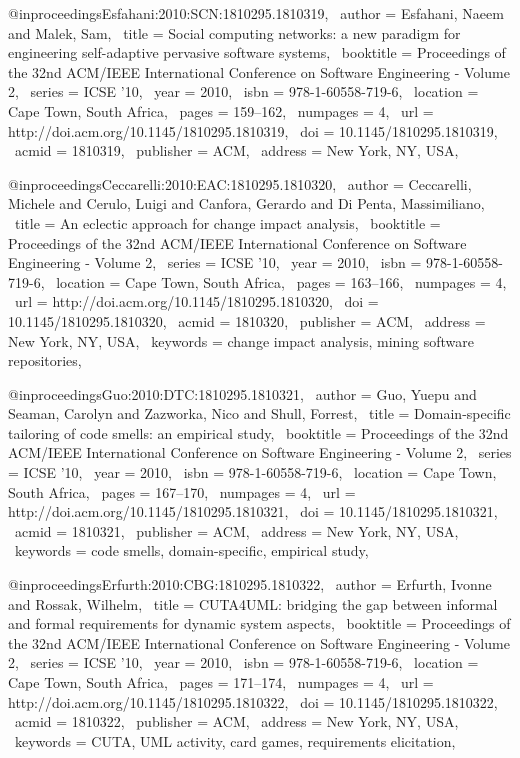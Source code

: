 @inproceedings{Esfahani:2010:SCN:1810295.1810319,
 author = {Esfahani, Naeem and Malek, Sam},
 title = {Social computing networks: a new paradigm for engineering self-adaptive pervasive software systems},
 booktitle = {Proceedings of the 32nd ACM/IEEE International Conference on Software Engineering - Volume 2},
 series = {ICSE '10},
 year = {2010},
 isbn = {978-1-60558-719-6},
 location = {Cape Town, South Africa},
 pages = {159--162},
 numpages = {4},
 url = {http://doi.acm.org/10.1145/1810295.1810319},
 doi = {10.1145/1810295.1810319},
 acmid = {1810319},
 publisher = {ACM},
 address = {New York, NY, USA},
} 

@inproceedings{Ceccarelli:2010:EAC:1810295.1810320,
 author = {Ceccarelli, Michele and Cerulo, Luigi and Canfora, Gerardo and Di Penta, Massimiliano},
 title = {An eclectic approach for change impact analysis},
 booktitle = {Proceedings of the 32nd ACM/IEEE International Conference on Software Engineering - Volume 2},
 series = {ICSE '10},
 year = {2010},
 isbn = {978-1-60558-719-6},
 location = {Cape Town, South Africa},
 pages = {163--166},
 numpages = {4},
 url = {http://doi.acm.org/10.1145/1810295.1810320},
 doi = {10.1145/1810295.1810320},
 acmid = {1810320},
 publisher = {ACM},
 address = {New York, NY, USA},
 keywords = {change impact analysis, mining software repositories},
} 

@inproceedings{Guo:2010:DTC:1810295.1810321,
 author = {Guo, Yuepu and Seaman, Carolyn and Zazworka, Nico and Shull, Forrest},
 title = {Domain-specific tailoring of code smells: an empirical study},
 booktitle = {Proceedings of the 32nd ACM/IEEE International Conference on Software Engineering - Volume 2},
 series = {ICSE '10},
 year = {2010},
 isbn = {978-1-60558-719-6},
 location = {Cape Town, South Africa},
 pages = {167--170},
 numpages = {4},
 url = {http://doi.acm.org/10.1145/1810295.1810321},
 doi = {10.1145/1810295.1810321},
 acmid = {1810321},
 publisher = {ACM},
 address = {New York, NY, USA},
 keywords = {code smells, domain-specific, empirical study},
} 

@inproceedings{Erfurth:2010:CBG:1810295.1810322,
 author = {Erfurth, Ivonne and Rossak, Wilhelm},
 title = {CUTA4UML: bridging the gap between informal and formal requirements for dynamic system aspects},
 booktitle = {Proceedings of the 32nd ACM/IEEE International Conference on Software Engineering - Volume 2},
 series = {ICSE '10},
 year = {2010},
 isbn = {978-1-60558-719-6},
 location = {Cape Town, South Africa},
 pages = {171--174},
 numpages = {4},
 url = {http://doi.acm.org/10.1145/1810295.1810322},
 doi = {10.1145/1810295.1810322},
 acmid = {1810322},
 publisher = {ACM},
 address = {New York, NY, USA},
 keywords = {CUTA, UML activity, card games, requirements elicitation},
} 

